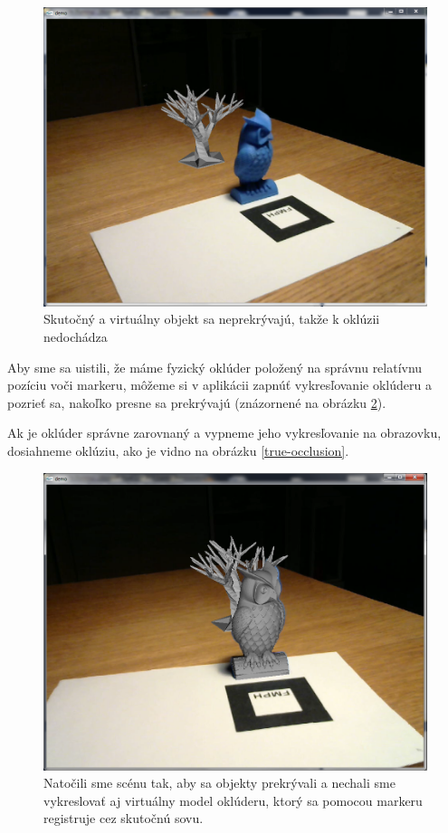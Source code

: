 \begin{figure}[h]
 \centering
 \includegraphics[max width=\textwidth]{pictures/screenshot-separate.png}
 \caption{Skutočný a virtuálny objekt sa neprekrývajú, takže k oklúzii nedochádza}
 \label{no-occlusion}
 \end{figure}

Aby sme sa uistili, že máme fyzický oklúder položený na správnu relatívnu pozíciu voči markeru, môžeme si v aplikácii zapnúť vykresľovanie oklúderu a pozrieť sa, nakoľko presne sa prekrývajú (znázornené na obrázku \ref{show-occluder}).

Ak je oklúder správne zarovnaný a vypneme jeho vykresľovanie na obrazovku, dosiahneme oklúziu, ako je vidno na obrázku \ref{true-occlusion}.

\begin{figure}[h]
 \centering
 \includegraphics[max width=\textwidth]{pictures/screenshot-occluder.png}
 \caption{Natočili sme scénu tak, aby sa objekty prekrývali a nechali sme vykreslovať aj virtuálny model oklúderu, ktorý sa pomocou markeru registruje cez skutočnú sovu.}
 \label{show-occluder}
 \end{figure}


